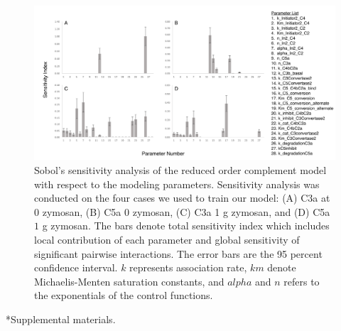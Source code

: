 \documentclass[12pt]{article}
\makeatletter
\renewcommand\section{\@startsection
	{subsection}{2}{0mm}
	{-0.2in}
	{0.05\baselineskip}
	{\normalfont\large\bfseries}}
\makeatother
\begin{document}
\begin{figure}[h]
\centering
\includegraphics[width=1.0\textwidth]{./figs/Figure4_Sensitivity_Analysis_v2.pdf}
\caption{Sobol's sensitivity analysis of the reduced order complement model with respect to the modeling parameters.  Sensitivity analysis was conducted on the four cases we used to train our model: (A) C3a at 0 zymosan, (B) C5a 0 zymosan, (C) C3a 1 g zymosan, and (D) C5a $1$ g zymosan. The bars denote total sensitivity index which includes local contribution of each parameter and global sensitivity of significant pairwise interactions. The error bars are the 95 percent confidence interval. $k$ represents association rate, $km$ denote Michaelis-Menten saturation constants, and $alpha$ and $n$ refers to the exponentials of the control functions.}\label{fig-SA}
\end{figure}

\clearpage

\renewcommand\thefigure{S\arabic{figure}}
\renewcommand\thetable{T\arabic{table}}
\renewcommand\thepage{S-\arabic{page}}
\renewcommand\theequation{S\arabic{equation}}

\setcounter{equation}{0}
\setcounter{table}{0}
\setcounter{figure}{0}
\setcounter{page}{1}


\section*{Supplemental materials.}
\end{document}
